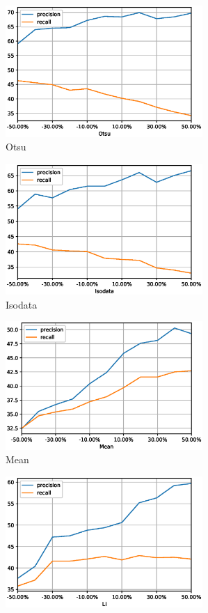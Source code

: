 \documentclass[11pt]{article}
\begin{document}
\begin{figure}[H]
	\begin{subfigure}{7cm}
		\centering\includegraphics[width=7.5cm]{files/results/otsu.eps}
		\caption{Otsu}
	\end{subfigure}
	\begin{subfigure}{7cm}
		\centering\includegraphics[width=7.5cm]{files/results/isodata.eps}
		\caption{Isodata}
	\end{subfigure}
	\begin{subfigure}{7cm}
		\centering\includegraphics[width=7.5cm]{files/results/mean.eps}
		\caption{Mean}
	\end{subfigure}
	\begin{subfigure}{7cm}
		\centering\includegraphics[width=7.5cm]{files/results/li.eps}

\end{subfigure}
\end{figure}
\end{document}
